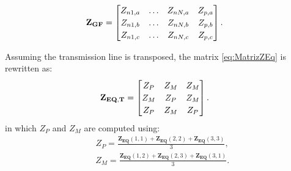 \documentclass[conference]{IEEEtran}
\begin{document}
\begin{equation}\label{eq:MatrizGF}
	\begin{aligned}
		\arraycolsep=0.8pt %
		\medmuskip = -2mu %
		\def\arraystretch{1.2}
		&\mathbf{Z_{GF}}
		=
		\begin{bmatrix}
			Z_{n1,a} & \ldots & Z_{nN,a} & Z_{p,a}  \\
			Z_{n1,b} & \ldots & Z_{nN,b} & Z_{p,b} \\
			Z_{n1,c} & \ldots & Z_{nN,c} & Z_{p,c} \\
		\end{bmatrix}.
	\end{aligned} 
\end{equation}

Assuming the transmission line is transposed, the matrix \eqref{eq:MatrizZEq} is rewritten as:
\begin{equation}\label{eq:MatrizTransp}
	\begin{aligned}
		\arraycolsep=0.8pt %
		\medmuskip = -2mu %
		\def\arraystretch{1.2}
		&\mathbf{Z_{EQ,T}}
		=
		\begin{bmatrix}
			Z_{P} & Z_{M} & Z_{M}  \\
			Z_{M} & Z_{P} & Z_{M} \\
			Z_{P} & Z_{M} & Z_{P} \\
		\end{bmatrix}.
	\end{aligned} 
\end{equation}
in which $Z_{P}$ and $Z_{M}$ are computed using:
\begin{equation}\label{eq:scalarZP}
	\begin{aligned}
		&Z_{P}=\frac{\mathbf{Z_{EQ}}(1,1)+\mathbf{Z_{EQ}}(2,2)+\mathbf{Z_{EQ}}(3,3)}{3},
	\end{aligned}
\end{equation}
\begin{equation}\label{eq:scalarZM}
	\begin{aligned}
		&Z_{M}=\frac{\mathbf{Z_{EQ}}(1,2)+\mathbf{Z_{EQ}}(2,3)+\mathbf{Z_{EQ}}(3,1)}{3}.
	\end{aligned}
\end{equation}
\end{document}

